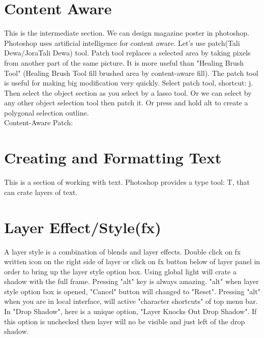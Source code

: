 \documentclass[11 pt]{article}
\begin{document}
\section{Content Aware}
This is the intermediate section. We can design magazine poster in photoshop. Photoshop uses artificial intelligence for content aware. Let's use patch(Tali Dewa/JoraTali Dewa) tool. Patch tool replaces a selected area by taking pixels from another part of the same picture. It is more useful than "Healing Brush Tool" (Healing Brush Tool fill brushed area by content-aware fill). The patch tool is useful for making big modification very quickly. Select patch tool, shortcut: j. Then select the object section as you select by a lasso tool. Or we can select by any other object selection tool then patch it. Or press and hold alt to create a polygonal selection outline. \\
Content-Aware Patch:

\section{Creating and Formatting Text}
This is a section of working with text. Photoshop provides a type tool: T, that can crate layers of text.

\section{Layer Effect/Style(fx)}
A layer style is a combination of blends and layer effects. Double click on fx written icon on the right side of layer or click on fx button below of layer panel in order to bring up the layer style option box. Using global light will crate a shadow with the full frame. Pressing "alt" key is always amazing. "alt" when layer style option box is opened, "Cancel" button will changed to "Reset". Pressing "alt" when you are in local interface, will active "character shortcuts" of top menu bar. In "Drop Shadow", here is a unique option, "Layer Knocks Out Drop Shadow". If this option is unchecked then layer will no be visible and just left of the drop shadow.
\end{document}
